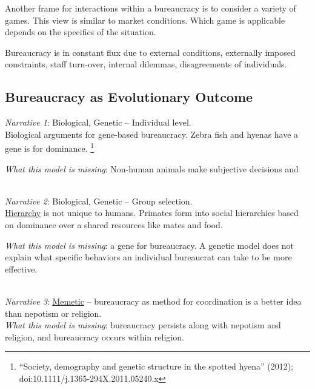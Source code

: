 
Another frame for interactions within a bureaucracy is to consider a variety of games. This view is similar to market conditions. Which game is applicable depends on the specifics of the situation. 

Bureaucracy is in constant flux due to external conditions, externally imposed constraints, staff turn-over, internal dilemmas, disagreements of individuals. 




\subsection*{Bureaucracy as Evolutionary Outcome}


\textit{Narrative 1}: Biological, Genetic -- Individual level. \\
Biological arguments for gene-based bureaucracy. Zebra fish and hyenas have a gene is for dominance. \footnote{``Society, demography and genetic structure in the spotted hyena'' (2012); doi:10.1111/j.1365-294X.2011.05240.x}


\textit{What this model is missing}: Non-human animals make subjective decisions and 

\ \\

\textit{Narrative 2}: Biological, Genetic -- Group selection. \\
\hyperref[sec:hierarchy-of-roles]{Hierarchy}
is not unique to humans. Primates form into social hierarchies based on dominance over a shared resources like mates and food.

\textit{What this model is missing}: a gene for bureaucracy. A genetic model does not explain what specific behaviors an individual bureaucrat can take to be more effective. 

\ \\

\textit{Narrative 3}: \href{https://en.wikipedia.org/wiki/Memetics}{Memetic} -- bureaucracy as method for coordination is a better idea than nepotism or religion. \\
\textit{What this model is missing}: bureaucracy persists along with nepotism and religion, and bureaucracy occurs within religion. 

